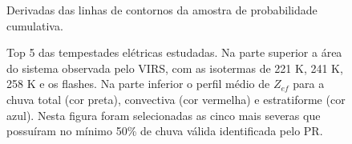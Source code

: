 \documentclass[preprint,authoryear,3p]{elsarticle}
\begin{document}
\begin{figure}

  \caption{Derivadas das linhas de contornos da amostra de probabilidade cumulativa.}
\end{figure}


\begin{figure}
\caption{Top 5 das tempestades elétricas estudadas. Na parte superior a área do sistema observada pelo VIRS, com as isotermas de 221 K, 241 K, 258 K e os flashes. Na parte inferior o perfil médio de $Z_{ef}$ para a chuva total (cor preta), convectiva (cor vermelha) e estratiforme (cor azul). Nesta figura foram selecionadas as cinco mais severas que possuíram no mínimo 50\% de chuva válida identificada pelo PR.}
\label{top5}
\end{figure} 
\end{document}

